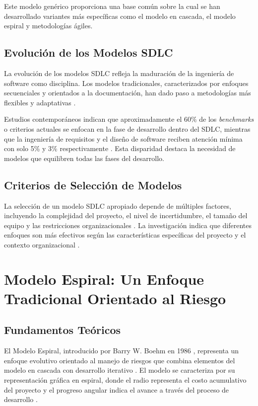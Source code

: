 \documentclass[conference]{IEEEtran}
\begin{document}
Este modelo genérico proporciona una base común sobre la cual se han desarrollado variantes más específicas como el modelo en cascada, el modelo espiral y metodologías ágiles.

\subsection{Evolución de los Modelos SDLC}

La evolución de los modelos SDLC refleja la maduración de la ingeniería de software como disciplina. Los modelos tradicionales, caracterizados por enfoques secuenciales y orientados a la documentación, han dado paso a metodologías más flexibles y adaptativas \cite{comprehensive_review_2023}.

Estudios contemporáneos indican que aproximadamente el 60\% de los \textit{benchmarks} o criterios actuales se enfocan en la fase de desarrollo dentro del SDLC, mientras que la ingeniería de requisitos y el diseño de software reciben atención mínima con solo 5\% y 3\% respectivamente \cite{wang2025survey}. Esta disparidad destaca la necesidad de modelos que equilibren todas las fases del desarrollo.

\subsection{Criterios de Selección de Modelos}

La selección de un modelo SDLC apropiado depende de múltiples factores, incluyendo la complejidad del proyecto, el nivel de incertidumbre, el tamaño del equipo y las restricciones organizacionales \cite{comparative_study_2020}. La investigación indica que diferentes enfoques son más efectivos según las características específicas del proyecto y el contexto organizacional \cite{ganjeizadeh2015statistical}.


\section{Modelo Espiral: Un Enfoque Tradicional Orientado al Riesgo}

\subsection{Fundamentos Teóricos}

El Modelo Espiral, introducido por Barry W. Boehm en 1986 \cite{boehm1988spiral}, representa un enfoque evolutivo orientado al manejo de riesgos que combina elementos del modelo en cascada con desarrollo iterativo \cite{boehm1988spiral}. El modelo se caracteriza por su representación gráfica en espiral, donde el radio representa el costo acumulativo del proyecto y el progreso angular indica el avance a través del proceso de desarrollo \cite{techtarget_spiral}.
\end{document}
